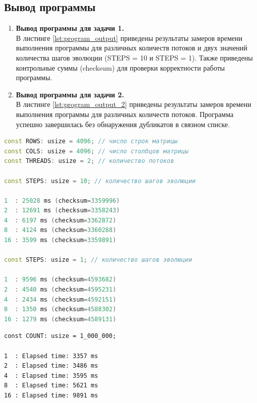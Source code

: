 \documentclass[a4paper, 14pt]{extarticle}
\begin{document}
\subsection*{Вывод программы}\label{Subsect::program_output}

\begin{enumerate}
    \item \textbf{Вывод программы для задачи 1.}\\
        В листинге \ref{lst:program_output} приведены результаты замеров времени выполнения программы для различных количеств потоков и двух значений количества шагов эволюции (STEPS = 10 и STEPS = 1). Также приведены контрольные суммы (checksum) для проверки корректности работы программы.
    \item \textbf{Вывод программы для задачи 2.}\\
        В листинге \ref{lst:program_output_2} приведены результаты замеров времени выполнения программы для различных количеств потоков. Программа успешно завершилась без обнаружения дубликатов в связном списке.
\end{enumerate}



\begin{lstlisting}[caption={Вывод программы 1}, label={lst:program_output}, language=C++]
const ROWS: usize = 4096; // число строк матрицы
const COLS: usize = 4096; // число столбцов матрицы
const THREADS: usize = 2; // количество потоков

const STEPS: usize = 10; // количество шагов эволюции

1  : 25028 ms (checksum=3359996)
2  : 12691 ms (checksum=3358243)
4  : 6197 ms (checksum=3362872)
8  : 4124 ms (checksum=3360288)
16 : 3599 ms (checksum=3359891)

const STEPS: usize = 1; // количество шагов эволюции

1  : 9596 ms (checksum=4593682)
2  : 4540 ms (checksum=4595231)
4  : 2434 ms (checksum=4592151)
8  : 1350 ms (checksum=4588302)
16 : 1279 ms (checksum=4589131)
\end{lstlisting}

\begin{lstlisting}[caption={Вывод программы 2}, label={lst:program_output_2}]
const COUNT: usize = 1_000_000;

1  : Elapsed time: 3357 ms
2  : Elapsed time: 3486 ms
4  : Elapsed time: 3595 ms
8  : Elapsed time: 5621 ms
16 : Elapsed time: 9891 ms
\end{lstlisting}
\end{document}
